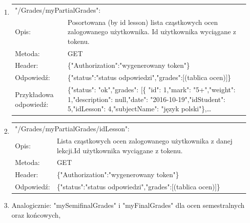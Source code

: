 \documentclass[12pt, titlepage]{article}
\begin{document}
\begin{enumerate}
	\item 
	{\renewcommand{\arraystretch}{1.5}
	\begin{tabular}[t]{p{3cm} p{15cm}}
	\multicolumn{2}{l}{"/Grades/myPartialGrades":} \\
	Opis: &  Posortowana (by id lesson) lista cząstkowych ocen zalogowanego użytkownika. \newline Id użytkownika wyciągane z tokenu. \\
	Metoda: & GET \\
	Header: & \{"Authorization":"wygenerowany token"\} \\
	Odpowiedź: & \{"status":"status odpowiedzi",\newline "grades":[(tablica ocen)]\} \\
	Przykładowa \newline odpowiedź: & \{"status": "ok",\newline "grades": [\newline \{ "id": 1,\newline "mark": "5+",\newline "weight": 1,\newline "description": null,\newline "date": "2016-10-19",\newline "idStudent": 5,\newline "idLesson": 4,\newline "subjectName": "język polski"\},\newline \ldots
	\end{tabular}}
	
	\item 
	{\renewcommand{\arraystretch}{1.5}
	\begin{tabular}[t]{p{3cm} p{15cm}}
	\multicolumn{2}{l}{"/Grades/myPartialGrades/{idLesson}":} \\
	Opis: &  Lista cząstkowych ocen zalogowanego użytkownika \newline z danej lekcji.\newline Id użytkownika wyciągane z tokenu. \\
	Metoda: & GET \\
	Header: & \{"Authorization":"wygenerowany token"\} \\
	Odpowiedź: & \{"status":"status odpowiedzi",\newline "grades":[(tablica ocen)]\}
	\end{tabular}}
	
	\item Analogicznie: "mySemifinalGrades" i "myFinalGrades" dla ocen semestralnych oraz końcowych,
	

\end{enumerate}
\end{document}
